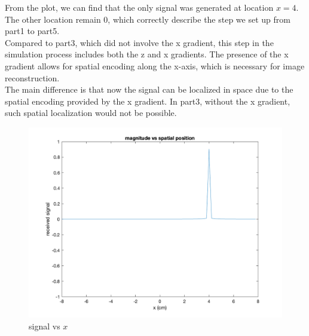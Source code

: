 \documentclass{report}
\begin{document}
From the plot, we can find that the only signal was generated at location $x = 4$. The other
 location remain 0, which correctly describe the step we set up from part1 to part5.\\

 Compared to part3, which did not involve the x gradient, this step in the simulation process 
 includes both the z and x gradients. The presence of the x gradient allows for spatial encoding 
 along the x-axis, which is necessary for image reconstruction.\\

 The main difference is that now the signal can be localized in space due to the spatial encoding 
 provided by the x gradient. In part3, without the x gradient, such spatial localization would not be possible.


\begin{figure}[hb]
    \centering
    \includegraphics[width=1\textwidth]{6.png}
    \caption{signal vs $x$}
\end{figure}
\newpage 
\end{document}
